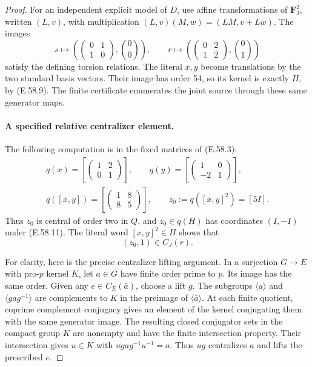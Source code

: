 \begin{proof}
For an independent explicit model of \(D\), use affine
transformations of \(\mathbf F_3^2\), written \((L,v)\),
with multiplication \((L,v)(M,w)=(LM,v+Lw)\).
The images
\[
 s\longmapsto
   \left(\begin{pmatrix}0&1\\1&0\end{pmatrix},\binom00\right),
 \qquad
 r\longmapsto
   \left(\begin{pmatrix}0&2\\1&2\end{pmatrix},\binom01\right)
 \tag{E.58.16}
\]
satisfy the defining torsion relations. The literal
\(x,y\) become translations by the two standard basis
vectors. Their image has order 54, so its kernel is
exactly \(H\), by \textup{(E.58.9)}. The finite
certificate enumerates the joint source through these
same generator maps.

\paragraph{A specified relative centralizer element.}
The following computation is in the fixed matrices of
\textup{(E.58.3)}:
\[
 \begin{gathered}
 q(x)=\left[\begin{pmatrix}1&2\\0&1\end{pmatrix}\right],\qquad
 q(y)=\left[\begin{pmatrix}1&0\\-2&1\end{pmatrix}\right],\\
 q([x,y])=\left[\begin{pmatrix}1&8\\8&5\end{pmatrix}\right],\qquad
 z_0:=q([x,y]^2)=[5I].
 \end{gathered}
 \tag{E.58.17}
\]
Thus \(z_0\) is central of order two in \(Q\), and
\(z_0\in q(H)\) has coordinates \((I,-I)\) under
\textup{(E.58.11)}. The literal word \([x,y]^2\in H\)
shows that
\[
                         (z_0,1)\in C_J(r).
 \tag{E.58.18}
\]

For clarity, here is the precise centralizer lifting
argument. In a surjection \(G\to E\) with pro-\(p\)
kernel \(K\), let \(a\in G\) have finite order prime
to \(p\). Its image has the same order. Given any
\(e\in C_E(\bar a)\), choose a lift \(g\).
The subgroups \(\langle a\rangle\) and
\(\langle gag^{-1}\rangle\) are complements to \(K\)
in the preimage of \(\langle\bar a\rangle\).
At each finite quotient, coprime complement conjugacy
gives an element of the kernel conjugating them with
the same generator image. The resulting closed
conjugator sets in the compact group \(K\) are nonempty
and have the finite intersection property. Their
intersection gives \(u\in K\) with
\(ugag^{-1}u^{-1}=a\). Thus \(ug\) centralizes
\(a\) and lifts the prescribed \(e\).


\end{proof}
